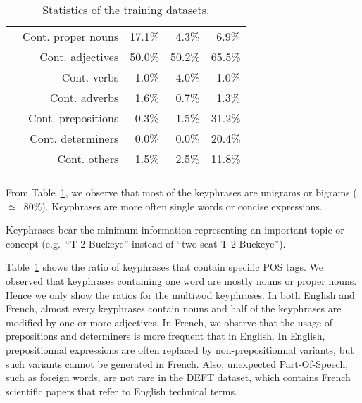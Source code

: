 \begin{table}[h]
\begin{tabular}{@{~}r@{~}r@{~}c@{~}c@{~}c@{~}}
        & Cont. proper nouns & 17.1\% & $~~$4.3\% & $~~$6.9\%\\
        & Cont. adjectives & 50.0\% & 50.2\% & 65.5\%\\
        & Cont. verbs & $~~$1.0\% & $~~$4.0\% & $~~$1.0\%\\
        & Cont. adverbs & $~~$1.6\% & $~~$0.7\% & $~~$1.3\%\\
        & Cont. prepositions & $~~$0.3\% & $~~$1.5\% & 31.2\%\\
        & Cont. determiners & $~~$0.0\% & $~~$0.0\% & 20.4\%\\
        & Cont. others & $~~$1.5\% & $~~$2.5\% & 11.8\%\\
        \addlinespace[.5\defaultaddspace]
        \bottomrule
      \end{tabular}
      \caption{Statistics of the training datasets.
               \label{tab:train_dataset_statistics}}
    \end{table}

    From Table~\ref{tab:train_dataset_statistics}, we observe that most of the
    keyphrases are unigrams or bigrams ($\simeq$~$80\%$). Keyphrases are more
    often single words or concise expressions.
    
    \begin{property}\label{prop:informativity}
      Keyphrases bear the minimum information representing an important topic or
      concept (e.g.~``T-2 Buckeye'' instead of ``two-seat T-2 Buckeye'').
    \end{property}

    Table~\ref{tab:train_dataset_statistics} shows the ratio of keyphrases that
    contain specific POS tags. We observed that keyphrases containing one word
    are mostly nouns or proper nouns. Hence we only show the ratios for the
    multiwod keyphrases. In both English and French, almost every keyphrases
    contain nouns and half of the keyphrases are modified by one or more
    adjectives. In French, we observe that the usage of prepositions and
    determiners is more frequent that in English. In English, prepositionnal
    expressions are often replaced by non-prepositionnal variants, but such
    variants cannot be generated in French. Also, unexpected Part-Of-Speech, such
    as foreign words, are not rare in the DEFT dataset, which contains French
    scientific papers that refer to English technical terms.

